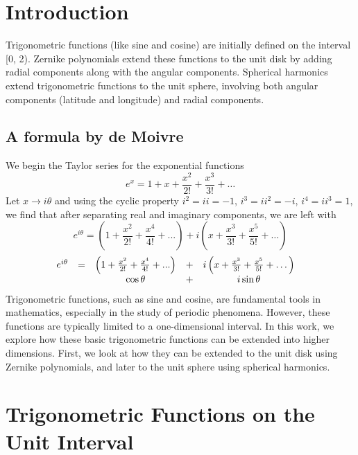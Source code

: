 % 
%
\section{Introduction}
Trigonometric functions (like sine and cosine) are initially defined on the interval \left[0, 2\pi).
Zernike polynomials extend these functions to the unit disk by adding radial components along with the angular components.
Spherical harmonics extend trigonometric functions to the unit sphere, involving both angular components (latitude and longitude) and radial components.

\subsection{A formula by de Moivre}
We begin the Taylor series for the exponential functions%
%
\begin{equation}
	e^{x} = 1 + x + \frac{x^{2}}{2!} + \frac{x^{3}}{3!} + \dots
\label{eq:exp}
\end{equation}
%
Let $x\to i \theta$ and using the cyclic property $i^{2} = i i = -1$, $i^{3} = i i^{2} = -i$,  $i^{4} = i i^{3} = 1$, we find that after separating real and imaginary components, we are left with
%
\begin{equation}
	e^{i \theta} = \left(1 + \frac{x^{2}}{2!} +  \frac{x^{4}}{4!} + ... \right) + i \left( x + \frac{x^{3}}{3!} +  \frac{x^{5}}{5!} + \dots \right)
\label{eq:exp}
\end{equation}
%
\begin{equation}
\begin{array}{ccc ccc}
	e^{i \theta} &= &\left(1 + \frac{x^{2}}{2!} +  \frac{x^{4}}{4!} + ... \right) &+ & i \left( x + \frac{x^{3}}{3!} +  \frac{x^{5}}{5!} + \dots \right)\\
		&&\cos \theta &+ &i \sin \theta &
\end{array}
\label{eq:de-Moivre}
\end{equation}
%
Trigonometric functions, such as sine and cosine, are fundamental tools in mathematics, especially in the study of periodic phenomena. However, these functions are typically limited to a one-dimensional interval. In this work, we explore how these basic trigonometric functions can be extended into higher dimensions. First, we look at how they can be extended to the unit disk using Zernike polynomials, and later to the unit sphere using spherical harmonics.

\section{Trigonometric Functions on the Unit Interval}

